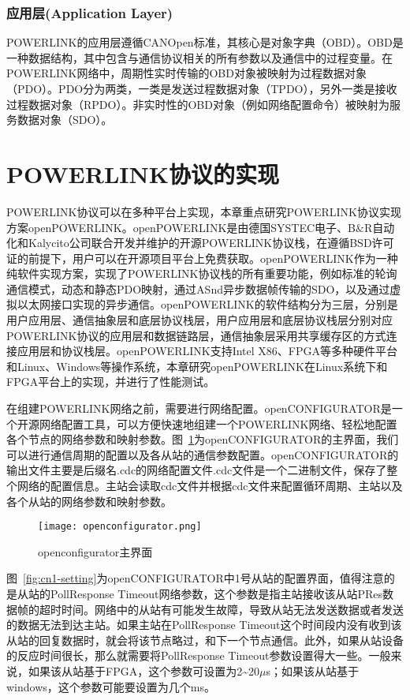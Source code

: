 \subsubsection{应用层(Application Layer)}

POWERLINK的应用层遵循CANOpen标准，其核心是对象字典（OBD）\cite{jin2012}。OBD是一种数据结构，其中包含与通信协议相关的所有参数以及通信中的过程变量。在POWERLINK网络中，周期性实时传输的OBD对象被映射为过程数据对象（PDO）。PDO分为两类，一类是发送过程数据对象（TPDO），另外一类是接收过程数据对象（RPDO）。非实时性的OBD对象（例如网络配置命令）被映射为服务数据对象（SDO）。


\section{POWERLINK协议的实现}
\label{POWERLINK协议的实现}
POWERLINK协议可以在多种平台上实现，本章重点研究POWERLINK协议实现方案openPOWERLINK。openPOWERLINK是由德国SYSTEC电子、B$\&$R自动化和Kalycito公司联合开发并维护的开源POWERLINK协议栈，在遵循BSD许可证的前提下，用户可以在开源项目平台上\cite{downoplk}免费获取。openPOWERLINK作为一种纯软件实现方案，实现了POWERLINK协议栈的所有重要功能，例如标准的轮询通信模式，动态和静态PDO映射，通过ASnd异步数据帧传输的SDO，以及通过虚拟以太网接口实现的异步通信\cite{oplk}。openPOWERLINK的软件结构分为三层，分别是用户应用层、通信抽象层和底层协议栈层，用户应用层和底层协议栈层分别对应POWERLINK协议的应用层和数据链路层，通信抽象层采用共享缓存区的方式连接应用层和协议栈层。openPOWERLINK支持Intel X86、FPGA等多种硬件平台和Linux、Windows等操作系统，本章研究openPOWERLINK在Linux系统下和FPGA平台上的实现，并进行了性能测试。

在组建POWERLINK网络之前，需要进行网络配置。openCONFIGURATOR是一个开源网络配置工具\cite{openCONFIGURATOR}，可以方便快速地组建一个POWERLINK网络、轻松地配置各个节点的网络参数和映射参数。图~\ref{fig:openconfigurator}为openCONFIGURATOR的主界面，我们可以进行通信周期的配置以及各从站的通信参数配置。openCONFIGURATOR的输出文件主要是后缀名.cdc的网络配置文件.cdc文件是一个二进制文件，保存了整个网络的配置信息。主站会读取cdc文件并根据cdc文件来配置循环周期、主站以及各个从站的网络参数和映射参数。

\begin{figure}[!htb]
  \centering
  \texttt{[image: openconfigurator.png]}
  \caption{openconfigurator主界面}
  \label{fig:openconfigurator}
\end{figure}

图~\ref{fig:cn1-setting}为openCONFIGURATOR中1号从站的配置界面，值得注意的是从站的PollResponse Timeout网络参数，这个参数是指主站接收该从站PRes数据帧的超时时间。网络中的从站有可能发生故障，导致从站无法发送数据或者发送的数据无法到达主站。如果主站在PollResponse Timeout这个时间段内没有收到该从站的回复数据时，就会将该节点略过，和下一个节点通信。此外，如果从站设备的反应时间很长，那么就需要将PollResponse Timeout参数设置得大一些。一般来说，如果该从站基于FPGA，这个参数可设置为2\~{}20$\mu$s；如果该从站基于windows，这个参数可能要设置为几个ms。

